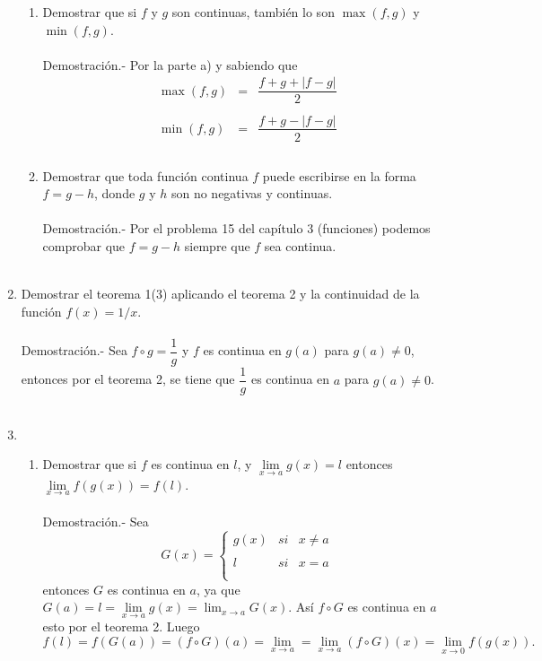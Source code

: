 \begin{enumerate}[\bfseries 1.]
\begin{enumerate}[\bfseries (a)]
    \item Demostrar que si $f$ y $g$ son continuas, también lo son $\max(f,g)$ y $\min(f,g)$.\\\\
	Demostración.-\; Por la parte a) y sabiendo que 
	$$\begin{array}{rcl}
	    \max(f,g)&=&\dfrac{f+g+|f-g|}{2}\\\\
	    \min(f,g)&=&\dfrac{f+g-|f-g|}{2}\\\\
	    \end{array}$$

    \item Demostrar que toda función continua $f$ puede escribirse en la forma $f=g-h$, donde $g$ y $h$ son no negativas y continuas.\\\\
	Demostración.-\; Por el problema 15 del capítulo 3 (funciones) podemos comprobar que $f=g-h$ siempre que $f$ sea continua.\\\\ 

\end{enumerate}

\item Demostrar el teorema 1(3) aplicando el teorema 2 y la continuidad de la función $f(x)=1/x$.\\\\
    Demostración.-\; Sea $f\circ g = \dfrac{1}{g}$ y $f$ es continua en $g(a)$ para $g(a)\neq 0$, entonces por el teorema 2, se tiene que $\dfrac{1}{g}$ es continua en $a$ para $g(a)\neq 0$.\\\\

\item 
    \begin{enumerate}[\bfseries (a)]

	\item Demostrar que si $f$ es continua en $l$, y $\lim\limits_{x\to a} g(x) = l$ entonces $\lim\limits_{x\to a}f(g(x)) = f(l)$.\\\\
	    Demostración.-\; Sea 
	    $$G(x) = \left\{\begin{array}{rcl}
		    g(x)&si&x\neq a\\\\
			l&si&x=a\\\\
	    \end{array}\right.$$
	    entonces $G$ es continua en $a$, ya que $G(a)=l=\lim\limits_{x\to a} g(x) = \lim_{x\to a} G(x)$. Así $f\circ G$ es continua en $a$ esto por el teorema 2. Luego 
	    $$f(l)=f(G(a))=(f\circ G)(a) = \lim\limits_{x\to a} = \lim\limits_{x\to a}(f\circ G)(x) = \lim\limits_{x\to 0} f(g(x)).$$\\


\end{enumerate}
\end{enumerate}
